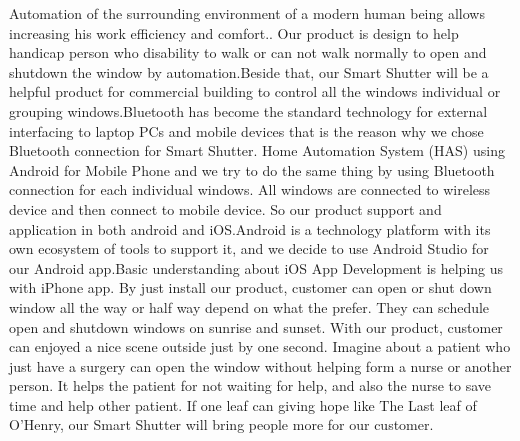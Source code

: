 
Automation of the surrounding environment of a modern human being allows increasing his work efficiency and comfort.\cite{Patz2013}. Our product is design to help handicap person who disability to walk or can not walk normally to open and shutdown the window by automation.Beside that, our Smart Shutter will be a helpful product for commercial building to control all the windows individual or grouping windows.Bluetooth has become the standard technology for external interfacing to laptop PCs and mobile devices\cite{Hansen} that is the reason why we chose Bluetooth connection for Smart Shutter. Home Automation System (HAS) using Android for Mobile Phone\cite{Panth2011} and we try to do the same thing by using Bluetooth connection for each individual windows. All windows are connected to wireless device and then connect to mobile device. So our product support and application in both android and iOS.Android is a technology platform with its own ecosystem of tools to support it\cite{Gerber}, and we decide to use Android Studio for our Android app.Basic understanding about iOS App Development\cite{Chang} is helping us with iPhone app. By just install our product, customer can open or shut down window all the way or half way depend on what the prefer. They can schedule open and shutdown windows on sunrise and sunset. With our product, customer can enjoyed a nice scene outside just by one second. Imagine about a patient who just have a surgery can open the window without helping form a nurse or another person. It helps the patient for not waiting for help, and also the nurse to save time and help other patient. If one leaf can giving hope like The Last leaf of O'Henry, our Smart Shutter will bring people more for our customer.



